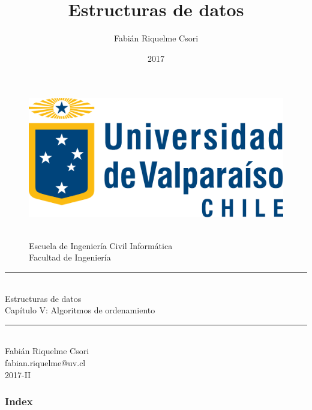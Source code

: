\documentclass{beamer} %
\title{Estructuras de datos}   %
\author{Fabián Riquelme Csori} %
\date{2017}                    %
\institute{Universidad de Valparaíso}                 %
\newcommand{\HRule}{\rule{\linewidth}{0.2mm}\\[1ex]}
\begin{document}
%

\begin{frame}[plain]
  \begin{figure}[h]
    \begin{minipage}{0.3\textwidth}
    \includegraphics[width=.9\textwidth]{./image/logo-UV.png}
    \end{minipage}
    \begin{minipage}{0.65\textwidth}
     $~$\\[3.6ex]
     \footnotesize{Escuela de Ingeniería Civil Informática}\\
     \footnotesize{Facultad de Ingeniería}
    \end{minipage}
  \end{figure}
  \begin{center}
    \vspace{1ex}
    \HRule
    \Large{Estructuras de datos}\\{\small Capítulo V: Algoritmos de ordenamiento}\\[-1ex]
    \HRule\vspace{1ex}
    \large{Fabián Riquelme Csori}\\[.5ex]\footnotesize{fabian.riquelme@uv.cl}\\[6ex] {\tiny 2017-II}\\[6ex]
  \end{center}
\end{frame}

\begin{frame}
 \frametitle{Index}
 \scriptsize 			%
 \tableofcontents		%
\end{frame}
\end{document}
